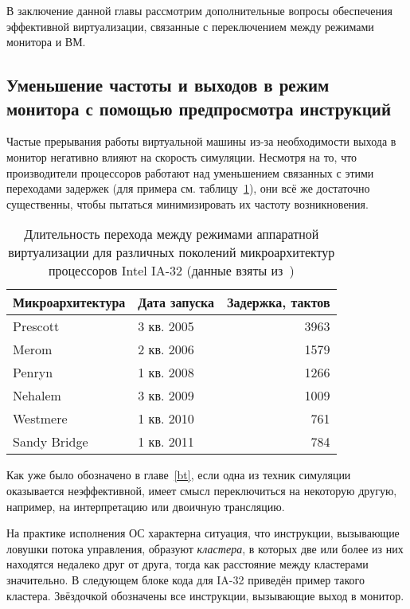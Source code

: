 В заключение данной главы рассмотрим дополнительные вопросы обеспечения эффективной виртуализации, связанные с переключением между режимами монитора и ВМ.

\subsection[Уменьшение частоты и выходов в монитор]{Уменьшение частоты и выходов в режим монитора с помощью предпросмотра инструкций}

Частые прерывания работы виртуальной машины из-за необходимости выхода в монитор негативно влияют на скорость симуляции.  Несмотря на то, что производители процессоров работают над уменьшением связанных с этими переходами задержек (для примера см. таблицу~\ref{tab:vmexit-latency}), они всё же достаточно существенны, чтобы пытаться минимизировать их частоту возникновения.

\begin{table}[htb]
\centering
\begin{tabular}{|l|l|r|}\hline
\textbf{Микроархитектура} & \textbf{Дата запуска} & \textbf{Задержка, тактов} \\\hline
Prescott     & 3 кв. 2005 & 3963 \\\hline
Merom        & 2 кв. 2006 & 1579 \\\hline
Penryn       & 1 кв. 2008 & 1266 \\\hline
Nehalem      & 3 кв. 2009 & 1009 \\\hline
Westmere     & 1 кв. 2010 & 761 \\\hline
Sandy Bridge & 1 кв. 2011 & 784 \\\hline
\end{tabular}
\caption[Длительность перехода между режимами аппаратной виртуализации]{Длительность перехода между режимами аппаратной виртуализации для различных поколений микроархитектур процессоров Intel IA-32 (данные взяты из~\cite{Agesen:2012:STA:2342821.2342856})}
\label{tab:vmexit-latency}
\end{table}

Как уже было обозначено в главе~\ref{bt}, если одна из техник симуляции оказывается неэффективной, имеет смысл переключиться на некоторую другую, например, на интерпретацию или двоичную трансляцию.

На практике исполнения ОС характерна ситуация, что инструкции, вызывающие ловушки потока управления, образуют \emph{кластера}, в которых две или более из них находятся недалеко друг от друга, тогда как расстояние между кластерами значительно. В следующем блоке кода для IA-32 приведён пример такого кластера. Звёздочкой обозначены все инструкции, вызывающие выход в монитор.

